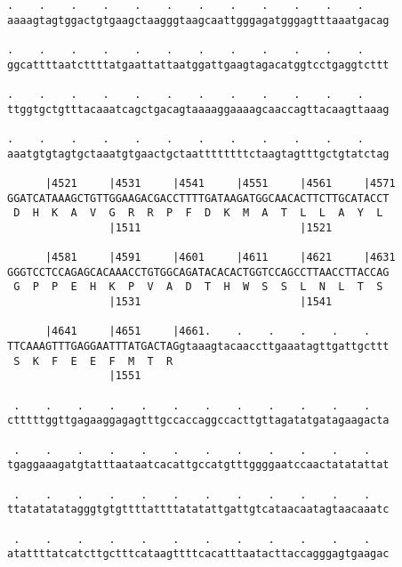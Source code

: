 \documentclass{article}
\begin{document}
\begin{Verbatim}
.    .    .    .    .    .    .    .    .    .    .    .    
aaaagtagtggactgtgaagctaagggtaagcaattgggagatgggagtttaaatgacag
                                                            
.    .    .    .    .    .    .    .    .    .    .    .    
ggcattttaatcttttatgaattattaatggattgaagtagacatggtcctgaggtcttt
                                                            
.    .    .    .    .    .    .    .    .    .    .    .    
ttggtgctgtttacaaatcagctgacagtaaaaggaaaagcaaccagttacaagttaaag
                                                            
.    .    .    .    .    .    .    .    .    .    .    .    
aaatgtgtagtgctaaatgtgaactgctaattttttttctaagtagtttgctgtatctag
                                                            
      |4521     |4531     |4541     |4551     |4561     |4571
GGATCATAAAGCTGTTGGAAGACGACCTTTTGATAAGATGGCAACACTTCTTGCATACCT
 D  H  K  A  V  G  R  R  P  F  D  K  M  A  T  L  L  A  Y  L 
                |1511                         |1521         
  
      |4581     |4591     |4601     |4611     |4621     |4631
GGGTCCTCCAGAGCACAAACCTGTGGCAGATACACACTGGTCCAGCCTTAACCTTACCAG
 G  P  P  E  H  K  P  V  A  D  T  H  W  S  S  L  N  L  T  S 
                |1531                         |1541         
  
      |4641     |4651     |4661.    .    .    .    .    .   
TTCAAAGTTTGAGGAATTTATGACTAGgtaaagtacaaccttgaaatagttgattgcttt
 S  K  F  E  E  F  M  T  R                                  
                |1551                                       
  
 .    .    .    .    .    .    .    .    .    .    .    .   
ctttttggttgagaaggagagtttgccaccaggccacttgttagatatgatagaagacta
                                                            
 .    .    .    .    .    .    .    .    .    .    .    .   
tgaggaaagatgtatttaataatcacattgccatgtttggggaatccaactatatattat
                                                            
 .    .    .    .    .    .    .    .    .    .    .    .   
ttatatatatagggtgtgttttattttatatattgattgtcataacaatagtaacaaatc
                                                            
 .    .    .    .    .    .    .    .    .    .    .    .   
atattttatcatcttgctttcataagttttcacatttaatacttaccagggagtgaagac
                                                            

\end{Verbatim}
\end{document}
